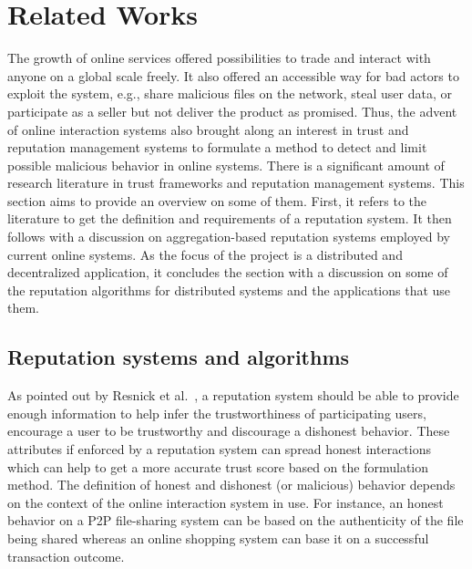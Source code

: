 \chapter{Related Works}\label{ch:litrev}
The growth of online services offered possibilities to trade and interact with
anyone on a global scale freely. It also offered an accessible way for bad
actors to exploit the system, e.g., share malicious files on the network, steal
user data, or participate as a seller but not deliver the product as promised.
Thus, the advent of online interaction systems also brought along an interest
in trust and reputation management systems to formulate a method to detect and
limit possible malicious behavior in online systems. There is a significant
amount of research literature in trust frameworks and reputation management
systems. This section aims to provide an overview on some of them. First, it
refers to the literature to get the definition and requirements of a reputation
system. It then follows with a discussion on aggregation-based reputation
systems employed by current online systems. As the focus of the project is a
distributed and decentralized application, it concludes the section with a
discussion on some of the reputation algorithms for distributed systems and the
applications that use them.

\section{Reputation systems and algorithms}
As pointed out by Resnick et al.~\cite{resnick2000reputation}, a reputation
system should be able to provide enough information to help infer the
trustworthiness of participating users, encourage a user to be trustworthy and
discourage a dishonest behavior. These attributes if enforced by a reputation
system can spread honest interactions which can help to get a more accurate
trust score based on the formulation method. The definition of honest and
dishonest (or malicious) behavior depends on the context of the online
interaction system in use. For instance, an honest behavior on a P2P
file-sharing system can be based on the authenticity of the file being shared
whereas an online shopping system can base it on a successful transaction
outcome. \par 

